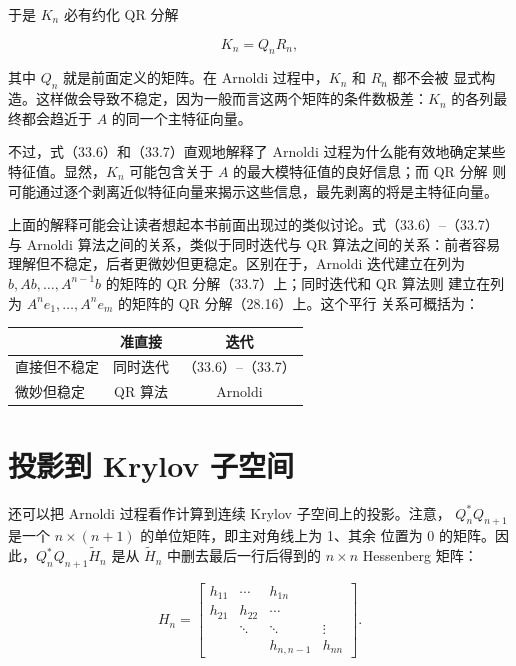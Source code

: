 \documentclass[UTF8,fontset=none,12pt]{ctexart}
\begin{document}
于是 $K_n$ 必有约化 QR 分解

\begin{equation}
K_n=Q_nR_n,
\tag{33.7}
\end{equation}

其中 $Q_n$ 就是前面定义的矩阵。在 Arnoldi 过程中，$K_n$ 和 $R_n$ 都不会被
显式构造。这样做会导致不稳定，因为一般而言这两个矩阵的条件数极差：$K_n$
的各列最终都会趋近于 $A$ 的同一个主特征向量。

不过，式（33.6）和（33.7）直观地解释了 Arnoldi 过程为什么能有效地确定某些
特征值。显然，$K_n$ 可能包含关于 $A$ 的最大模特征值的良好信息；而 QR 分解
则可能通过逐个剥离近似特征向量来揭示这些信息，最先剥离的将是主特征向量。

上面的解释可能会让读者想起本书前面出现过的类似讨论。式（33.6）–（33.7）
与 Arnoldi 算法之间的关系，类似于同时迭代与 QR 算法之间的关系：前者容易
理解但不稳定，后者更微妙但更稳定。区别在于，Arnoldi 迭代建立在列为
$b,Ab,\ldots,A^{n-1}b$ 的矩阵的 QR 分解（33.7）上；同时迭代和 QR 算法则
建立在列为 $A^ne_1,\ldots,A^ne_m$ 的矩阵的 QR 分解（28.16）上。这个平行
关系可概括为：

\begin{center}
\renewcommand{\arraystretch}{1.45}
\begin{tabular}{>{\centering\arraybackslash}m{4.0cm}|c|c}
 & 准直接 & 迭代\\
\hline
直接但不稳定 & 同时迭代 & （33.6）–（33.7）\\
微妙但稳定 & QR 算法 & Arnoldi
\end{tabular}
\end{center}

\section*{投影到 Krylov 子空间}

还可以把 Arnoldi 过程看作计算到连续 Krylov 子空间上的投影。注意，
$Q_n^*Q_{n+1}$ 是一个 $n\times(n+1)$ 的单位矩阵，即主对角线上为 1、其余
位置为 0 的矩阵。因此，$Q_n^*Q_{n+1}\widetilde H_n$ 是从
$\widetilde H_n$ 中删去最后一行后得到的 $n\times n$ Hessenberg 矩阵：

\begin{equation}
H_n=
\begin{bmatrix}
h_{11}&\cdots&h_{1n}\\
h_{21}&h_{22}&\cdots\\
&\ddots&\ddots&\vdots\\
&&h_{n,n-1}&h_{nn}
\end{bmatrix}.
\tag{33.8}
\end{equation}
\end{document}
